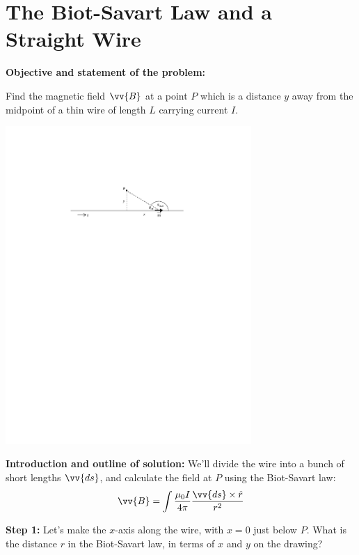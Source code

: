 \section{The Biot-Savart Law and a Straight Wire}
\label{biot_savart_straight_wire}


\makelabheader %

\vspace{0.5cm}

\textbf{Objective and statement of the problem:}

Find the magnetic field $\vv{B}$ at a point $P$ which is a distance $y$ away from the midpoint of a thin wire of length $L$ carrying current $I$.
\begin{center}
    \includegraphics[width=0.7\textwidth]{biot_savart_straight_wire/straight_wire.pdf}
\end{center}

\textbf{Introduction and outline of solution:}
We'll divide the wire into a bunch of short lengths $\vv{ds}$, and calculate the field at $P$ using the Biot-Savart law:
\begin{displaymath}
\vv{B} = \int{\frac{\mu_0I}{4 \pi}\frac{\vv{ds}\times \hat{r}}{r^2}}
\end{displaymath}

\textbf{Step 1:} \newline
Let's make the $x$-axis along the wire, with $x=0$ just below $P$.  What is the distance $r$ in the Biot-Savart law, in terms of $x$ and $y$ on the drawing?

